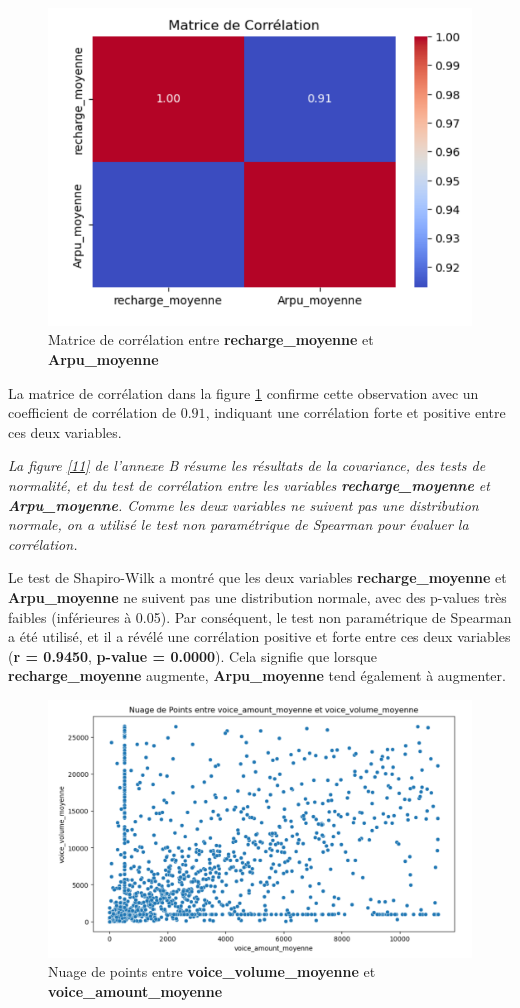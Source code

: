 \begin{figure}[H]
    \centering
    \includegraphics[width=0.6\linewidth]{capture_sas_48.png}
    \caption{Matrice de corrélation entre \textbf{recharge\_moyenne} et \textbf{Arpu\_moyenne}}
    \label{matrice1}
\end{figure}

\noindent
La matrice de corrélation dans la figure \ref{matrice1} confirme cette observation avec un coefficient de corrélation de \(0.91\), indiquant une corrélation forte et positive entre ces deux variables.\par

\textit{La figure \ref{11} de l'annexe B résume les résultats de la covariance, des tests de normalité, et du test de corrélation entre les variables \textbf{recharge\_moyenne} et \textbf{Arpu\_moyenne}. Comme les deux variables ne suivent pas une distribution normale, on a utilisé le test non paramétrique de Spearman pour évaluer la corrélation.}



\noindent
Le test de Shapiro-Wilk a montré que les deux variables \textbf{recharge\_moyenne} et \textbf{Arpu\_moyenne} ne suivent pas une distribution normale, avec des p-values très faibles (inférieures à 0.05). Par conséquent, le test non paramétrique de Spearman a été utilisé, et il a révélé une corrélation positive et forte entre ces deux variables (\textbf{r = 0.9450}, \textbf{p-value = 0.0000}). Cela signifie que lorsque \textbf{recharge\_moyenne} augmente, \textbf{Arpu\_moyenne} tend également à augmenter.

\begin{figure}[H]
    \centering
    \includegraphics[width=0.6\linewidth]{capture_sas_50.png}
    \caption{Nuage de points entre \textbf{voice\_volume\_moyenne} et \textbf{voice\_amount\_moyenne}}
    \label{nuage4}
\end{figure}

